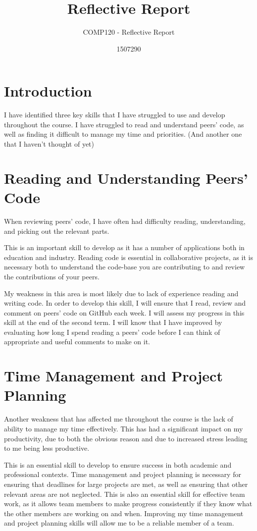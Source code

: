 \documentclass{scrartcl}
\title{Reflective Report}
\subtitle{COMP120 - Reflective Report}
\author{1507290}
\begin{document}
\maketitle

\abstract{}

\section{Introduction}
I have identified three key skills that I have struggled to use and develop throughout the course. I have struggled to read and understand peers' code, as well as finding it difficult to manage my time and priorities. (And another one that I haven't thought of yet)

\section{Reading and Understanding Peers' Code}
When reviewing peers' code, I have often had difficulty reading, understanding, and picking out the relevant parts.

This is an important skill to develop as it has a number of applications both in education and industry. Reading code is essential in collaborative projects, as it is necessary both to understand the code-base you are contributing to and review the contributions of your peers.

My weakness in this area is most likely due to lack of experience reading and writing code. In order to develop this skill, I will ensure that I read, review and comment on peers' code on GitHub each week. I will assess my progress in this skill at the end of the second term. I will know that I have improved by evaluating how long I spend reading a peers' code before I can think of appropriate and useful comments to make on it. 

\section{Time Management and Project Planning}
Another weakness that has affected me throughout the course is the lack of ability to manage my time effectively. This has had a significant impact on my productivity, due to both the obvious reason and due to increased stress leading to me being less productive.

This is an essential skill to develop to ensure success in both academic and professional contexts. Time management and project planning is necessary for ensuring that deadlines for large projects are met, as well as ensuring that other relevant areas are not neglected. This is also an essential skill for effective team work, as it allows team members to make progress consistently if they know what the other members are working on and when. Improving my time management and project planning skills will allow me to be a reliable member of a team.
\end{document}
